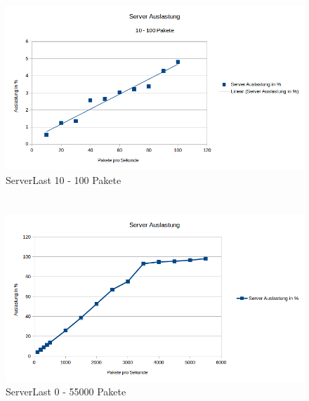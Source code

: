 \documentclass[a4paper]{spie}  %
\begin{document}
\begin{appendices}
\section{}
\begin{figure}[H]
	\centering
	\includegraphics[width=1\textwidth]{images/ServerLast2.png}
	\caption{ServerLast 10 - 100 Pakete}
	\label{serverlast1-2}
\end{figure}


\section{}
\begin{figure}[H]
	\centering
	\includegraphics[width=1\textwidth]{images/ServerLast3.png}
	\caption{ServerLast 0 - 55000 Pakete}
	\label{serverlast2}
\end{figure}


\end{appendices}
\end{document}
